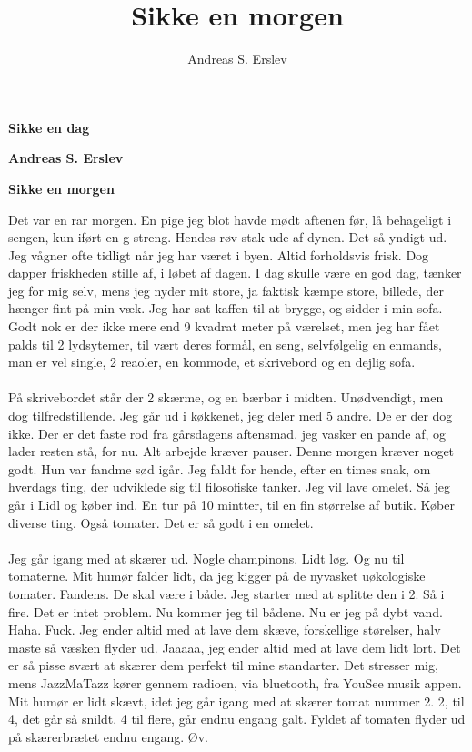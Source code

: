 \documentclass[]{article}
\title{Sikke en morgen}
\author{Andreas S. Erslev}
\begin{document}
\begin{center}
	\Large\textbf{Sikke en dag}
\end{center}

\begin{center}
	\large\textbf{Andreas S. Erslev}
\end{center}

\begin{center}
	\large\textbf{Sikke en morgen}
\end{center}

Det var en rar morgen. En pige jeg blot havde mødt aftenen før, lå behageligt i sengen, kun iført en g-streng. Hendes røv stak ude af dynen. Det så yndigt ud. Jeg vågner ofte tidligt når jeg har været i byen. Altid forholdsvis frisk. Dog dapper friskheden stille af, i løbet af dagen. I dag skulle være en god dag, tænker jeg for mig selv, mens jeg nyder mit store, ja faktisk kæmpe store, billede, der hænger fint på min væk. Jeg har sat kaffen til at brygge, og sidder i min sofa. Godt nok er der ikke mere end 9 kvadrat meter på værelset, men jeg har fået palds til 2 lydsytemer, til vært deres formål, en seng, selvfølgelig en enmands, man er vel single, 2 reaoler, en kommode, et skrivebord og en dejlig sofa. 
\\ \\
På skrivebordet står der 2 skærme, og en bærbar i midten. Unødvendigt, men dog tilfredstillende. Jeg går ud i køkkenet, jeg deler med 5 andre. De er der dog ikke. Der er det faste rod fra gårsdagens aftensmad. jeg vasker en pande af, og lader resten stå, for nu. Alt arbejde kræver pauser. Denne morgen kræver noget godt. Hun var fandme sød igår. Jeg faldt for hende, efter en times snak, om hverdags ting, der udviklede sig til filosofiske tanker. Jeg vil lave omelet. Så jeg går i Lidl og køber ind. En tur på 10 mintter, til en fin størrelse af butik. Køber diverse ting. Også tomater. Det er så godt i en omelet. 
\\ \\
Jeg går igang med at skærer ud. Nogle champinons. Lidt løg. Og nu til tomaterne. Mit humør falder lidt, da jeg kigger på de nyvasket uøkologiske tomater. Fandens. De skal være i både. Jeg starter med at splitte den i 2. Så i fire. Det er intet problem. Nu kommer jeg til bådene. Nu er jeg på dybt vand. Haha. Fuck. Jeg ender altid med at lave dem skæve, forskellige størelser, halv maste så væsken flyder ud. Jaaaaa, jeg ender altid med at lave dem lidt lort. Det er så pisse svært at skærer dem perfekt til mine standarter. Det stresser mig, mens JazzMaTazz kører gennem radioen, via bluetooth, fra YouSee musik appen. Mit humør er lidt skævt, idet jeg går igang med at skærer tomat nummer 2. 2, til 4, det går så snildt. 4 til flere, går endnu engang galt. Fyldet af tomaten flyder ud på skærerbrætet endnu engang. Øv.
\end{document}
